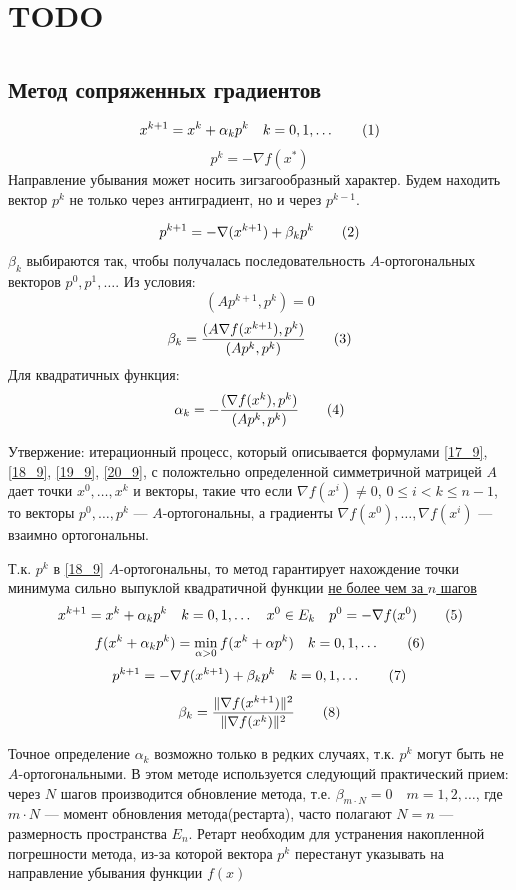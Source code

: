 \documentclass[oneside]{book}
\newcommand\addtag{\refstepcounter{equation}\tag{\theequation}}
\theoremstyle{plain}
\theoremstyle{remark}
\theoremstyle{definition}
\begin{document}
\chapter{TODO}
\label{sec:orgf9275ea}
\chapter{}
\label{sec:org1278a68}
\section{Метод сопряженных градиентов}
\label{sec:org646a470}
\[ x^{k + 1} = x^k + \alpha_k p^k \quad k = 0,1,\dots \addtag\label{17_9}\]
\[ p^k = - \nabla f(x^*) \]
Направление убывания может носить зигзагообразный характер. Будем находить вектор \(p^k\) не только через антиградиент, но и через \(p^{k - 1}\).

\[ p^{k + 1} = - \nabla(x^{k + 1}) + \beta_k p^k \addtag\label{18_9}\]
\(\beta_k\) выбираются так, чтобы получалась последовательность \(A\)-ортогональных векторов \(p^0, p^1, \dots\). Из условия:
\[ (Ap^{k + 1}, p^k) = 0 \]
\[ \beta_k = \frac{(A \nabla f(x^{k + 1}), p^k)}{(Ap^k, p^k)} \addtag\label{19_9}\]
Для квадратичных функция:
\[ \alpha_k = -\frac{(\nabla f(x^k), p^k)}{(Ap^k, p^k)} \addtag\label{20_9}\]

Утвержение: итерационный процесс, который описывается формулами \ref{17_9}, \ref{18_9}, \ref{19_9}, \ref{20_9}, с положтельно определенной симметричной матрицей \(A\) дает точки \(x^0,\dots,x^k\) и векторы, такие что если \(\nabla f(x^i) \neq 0\), \(0 \le i < k \le n - 1\), то векторы \(p^0,\dots,p^k\) --- \(A\)-ортогональны, а градиенты \(\nabla f(x^0), \dots, \nabla f(x^i)\) --- взаимно ортогональны.

Т.к. \(p^k\) в \ref{18_9} \(A\)-ортогональны, то метод гарантирует нахождение точки минимума сильно выпуклой квадратичной функции \uline{не более чем за \(n\) шагов}
\[ x^{k + 1} = x^k + \alpha_k p^k \quad k = 0,1,\dots\quad x^0 \in E_k\quad p^0 = - \nabla f(x^0) \addtag\label{21_9}\]
\[ f(x^k + \alpha_k p^k) = \min_{\alpha > 0} f(x^k + \alpha p^k)\quad k = 0,1, \dots \addtag\label{22_9}\]
\[ p^{k + 1} = -\nabla f(x^{k + 1}) + \beta_k p^k\quad k = 0,1,\dots \addtag\label{23_9}\]
\[ \beta_k = \frac{\Vert \nabla f(x^{k + 1}) \Vert ^2}{\Vert \nabla f(x^k) \Vert ^2} \addtag\label{24_9}\]

Точное определение \(\alpha_k\) возможно только в редких случаях, т.к. \(p^k\) могут быть не \(A\)-ортогональными. В этом методе используется следующий практический прием: через \(N\) шагов производится обновление метода, т.е. \(\beta_{m\cdot N} = 0\quad m = 1, 2, \dots\), где \(m\cdot N\) --- момент обновления метода(рестарта), часто полагают \(N = n\) --- размерность пространства \(E_n\). Ретарт необходим для устранения накопленной погрешности метода, из-за которой вектора \(p^k\) перестанут указывать на направление убывания функции \(f(x)\) 
\end{document}
